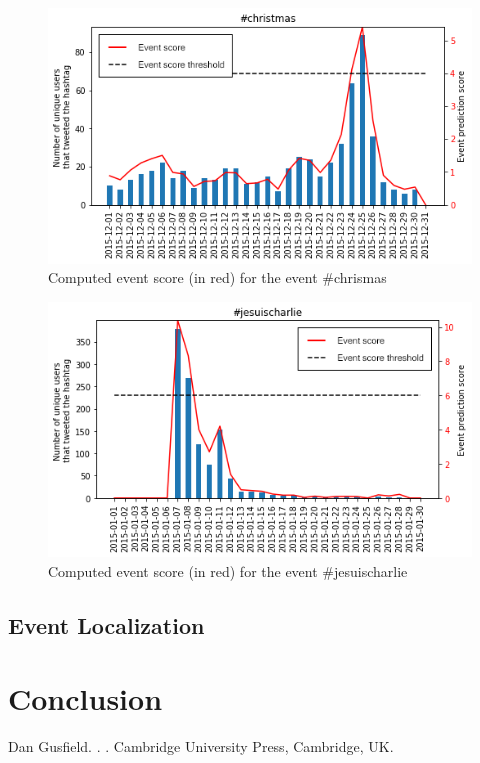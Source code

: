 \documentclass[11pt]{article}
\begin{document}
\begin{figure}[htbp]
  \vspace*{-1mm}
  \centering
  \includegraphics[width=\columnwidth]{figures/christmas_result.png}
  \vspace{-5mm}
  \caption{Computed event score (in red) for the event \#chrismas}
  \label{fig:christmas}
\end{figure}

\begin{figure}[htbp]
  \vspace*{-1mm}
  \centering
  \includegraphics[width=\columnwidth]{figures/jesuischarlie_result.png}
  \vspace{-5mm}
  \caption{Computed event score (in red) for the event \#jesuischarlie}
  \label{fig:jesuischarlie}
\end{figure}

\subsection{Event Localization}

\section{Conclusion}

\begin{thebibliography}{}

Dan Gusfield.
.
.
\newblock Cambridge University Press, Cambridge, UK.

\end{thebibliography}
\end{document}
